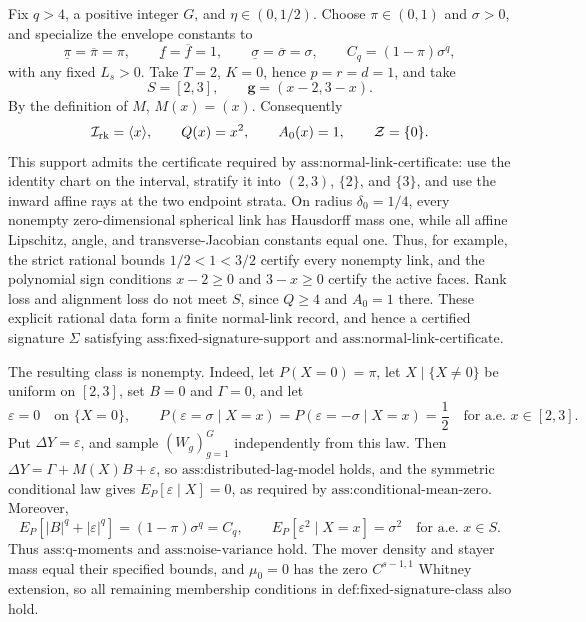 Fix \(q>4\), a positive integer \(G\), and \(\eta\in(0,1/2)\). Choose \(\pi\in(0,1)\) and \(\sigma>0\), and specialize the envelope constants to
\[
 \underline\pi=\overline\pi=\pi,
 \qquad
 \underline f=\overline f=1,
 \qquad
 \underline\sigma=\overline\sigma=\sigma,
 \qquad
 C_q=(1-\pi)\sigma^q,
\]
with any fixed \(L_s>0\). Take \(T=2\), \(K=0\), hence \(p=r=d=1\), and take
\[
 S=[2,3],\qquad \mathbf g=(x-2,3-x).
\]
By the definition of \(M\), \(M(x)=(x)\). Consequently
\[
 \mathcal I_{\rm rk}=\langle x\rangle,
 \qquad Q(x)=x^2,
 \qquad A_0(x)=1,
 \qquad \mathcal Z=\{0\}.
\]
This support admits the certificate required by \(\text{ass:normal-link-certificate}\): use the identity chart on the interval, stratify it into \((2,3)\), \(\{2\}\), and \(\{3\}\), and use the inward affine rays at the two endpoint strata. On radius \(\delta_0=1/4\), every nonempty zero-dimensional spherical link has Hausdorff mass one, while all affine Lipschitz, angle, and transverse-Jacobian constants equal one. Thus, for example, the strict rational bounds \(1/2<1<3/2\) certify every nonempty link, and the polynomial sign conditions \(x-2\ge0\) and \(3-x\ge0\) certify the active faces. Rank loss and alignment loss do not meet \(S\), since \(Q\ge4\) and \(A_0=1\) there. These explicit rational data form a finite normal-link record, and hence a certified signature \(\Sigma\) satisfying \(\text{ass:fixed-signature-support}\) and \(\text{ass:normal-link-certificate}\).

The resulting class is nonempty. Indeed, let \(P(X=0)=\pi\), let \(X\mid\{X\ne0\}\) be uniform on \([2,3]\), set \(B=0\) and \(\Gamma=0\), and let
\[
 \varepsilon=0\quad\text{on }\{X=0\},
 \qquad
 P(\varepsilon=\sigma\mid X=x)
 =P(\varepsilon=-\sigma\mid X=x)=\frac12
 \quad\text{for a.e. }x\in[2,3].
\]
Put \(\Delta Y=\varepsilon\), and sample \((W_g)_{g=1}^G\) independently from this law. Then \(\Delta Y=\Gamma+M(X)B+\varepsilon\), so \(\text{ass:distributed-lag-model}\) holds, and the symmetric conditional law gives \(E_P[\varepsilon\mid X]=0\), as required by \(\text{ass:conditional-mean-zero}\). Moreover,
\[
 E_P[|B|^q+|\varepsilon|^q]=(1-\pi)\sigma^q=C_q,
 \qquad
 E_P[\varepsilon^2\mid X=x]=\sigma^2
 \quad\text{for a.e. }x\in S.
\]
Thus \(\text{ass:q-moments}\) and \(\text{ass:noise-variance}\) hold. The mover density and stayer mass equal their specified bounds, and \(\mu_0=0\) has the zero \(C^{s-1,1}\) Whitney extension, so all remaining membership conditions in \(\text{def:fixed-signature-class}\) also hold.

